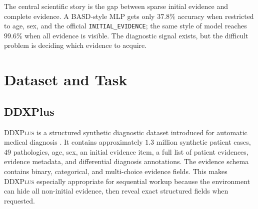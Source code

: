 \documentclass[11pt]{article}
\newcommand{\ddx}{\textsc{DDXPlus}}
\newcommand{\mlp}{\textsc{MLP}}
\begin{document}
\begin{table}[H]
\centering
\caption{Most important final results. ``All fields'' means all \ddx{} structured evidence is visible and is used only as a ceiling comparator.}
\end{table}

The central scientific story is the gap between sparse initial evidence and complete evidence. A BASD-style \mlp{} gets only $37.8\%$ accuracy when restricted to age, sex, and the official \texttt{INITIAL\_EVIDENCE}; the same style of model reaches $99.6\%$ when all evidence is visible. The diagnostic signal exists, but the difficult problem is deciding which evidence to acquire.

\section{Dataset and Task}

\subsection{DDXPlus}

\ddx{} is a structured synthetic diagnostic dataset introduced for automatic medical diagnosis \cite{ddxplus}. It contains approximately $1.3$ million synthetic patient cases, $49$ pathologies, age, sex, an initial evidence item, a full list of patient evidences, evidence metadata, and differential diagnosis annotations. The evidence schema contains binary, categorical, and multi-choice evidence fields. This makes \ddx{} especially appropriate for sequential workup because the environment can hide all non-initial evidence, then reveal exact structured fields when requested.
\end{document}
